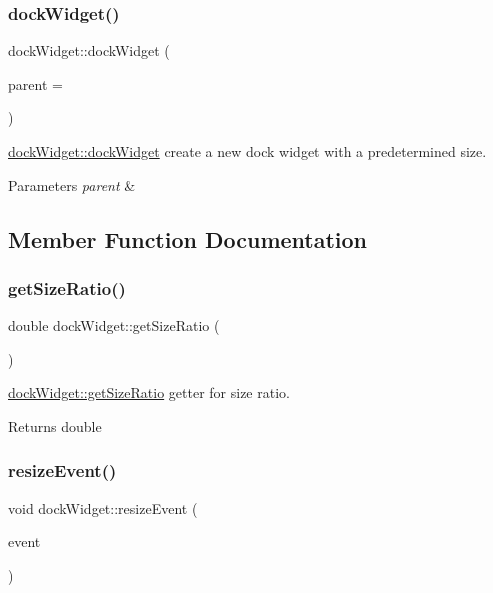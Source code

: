 \subsubsection{\texorpdfstring{dock\+Widget()}{dockWidget()}}
{\footnotesize\ttfamily dock\+Widget\+::dock\+Widget (\begin{DoxyParamCaption}\item[{Q\+Object $\ast$}]{parent = {} }\end{DoxyParamCaption})}



\mbox{\hyperlink{classdock_widget_af65ba19ef794133fb2b365dedc5b9d64}{dock\+Widget\+::dock\+Widget}} create a new dock widget with a predetermined size. 


\begin{DoxyParams}{Parameters}
{\em parent} & \\
\hline
\end{DoxyParams}


\subsection{Member Function Documentation}
\mbox{\label{classdock_widget_a2503861f92eb0ac30313dd713f398996}} 
\subsubsection{\texorpdfstring{get\+Size\+Ratio()}{getSizeRatio()}}
{\footnotesize\ttfamily double dock\+Widget\+::get\+Size\+Ratio (\begin{DoxyParamCaption}{ }\end{DoxyParamCaption})}



\mbox{\hyperlink{classdock_widget_a2503861f92eb0ac30313dd713f398996}{dock\+Widget\+::get\+Size\+Ratio}} getter for size ratio. 

\begin{DoxyReturn}{Returns}
double 
\end{DoxyReturn}
\mbox{\label{classdock_widget_ae9cc3b91f10ee2af70fd74c6422848b6}} 
\subsubsection{\texorpdfstring{resize\+Event()}{resizeEvent()}}
{\footnotesize\ttfamily void dock\+Widget\+::resize\+Event (\begin{DoxyParamCaption}\item[{Q\+Resize\+Event $\ast$}]{event }\end{DoxyParamCaption})}



